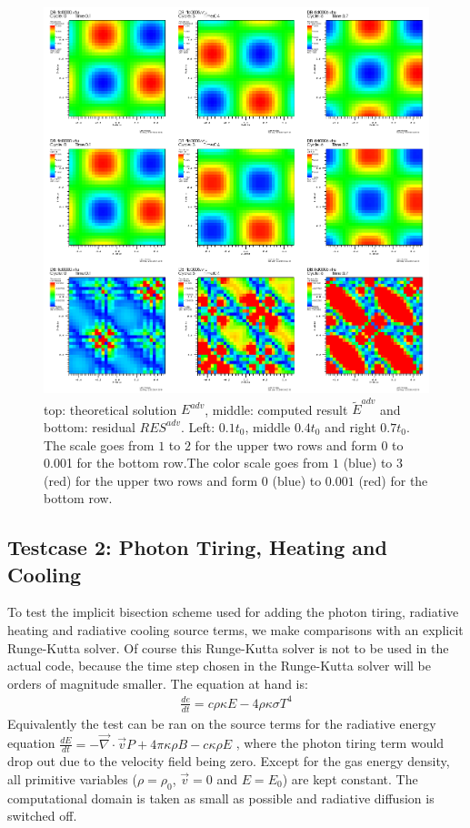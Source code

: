 \begin{figure}
\includegraphics[width = \textwidth]{visit0002.png}
\caption{top: theoretical solution $E^{adv}$, middle: computed result $\tilde{E}^{adv}$ and bottom: residual $RES^{adv}$. Left: $0.1 t_0$, middle $0.4 t_0$ and right $0.7 t_0$. The scale goes from $1$ to $2$ for the upper two rows and form 0 to 0.001 for the bottom row.The color scale goes from $1$ (blue) to $3$ (red) for the upper two rows and form $0$ (blue) to $0.001$ (red) for the bottom row.}
\label{fig: test_advection}
\end{figure}



\subsection{Testcase 2: Photon Tiring, Heating and Cooling}
To test the implicit bisection scheme used for adding the photon tiring, radiative heating and radiative cooling source terms, we make comparisons with an explicit Runge-Kutta solver. Of course this Runge-Kutta solver is not to be used in the actual code, because the time step chosen in the Runge-Kutta solver will be orders of magnitude smaller. The equation at hand is:
\begin{align}
\frac{d e}{dt} = c \rho \kappa E - 4 \rho \kappa \sigma T^4
\end{align}
Equivalently the test can be ran on the source terms for the radiative energy equation $\frac{dE}{dt} = - \vec{\nabla} \cdot \vec{v} P + 4\pi \kappa\rho B - c \kappa \rho E$ , where the photon tiring term would drop out due to the velocity field being zero.
Except for the gas energy density, all primitive variables ($\rho = \rho_0$, $\vec{v} = 0$ and $E = E_0$) are kept constant. The computational domain is taken as small as possible and radiative diffusion is switched off. \\

